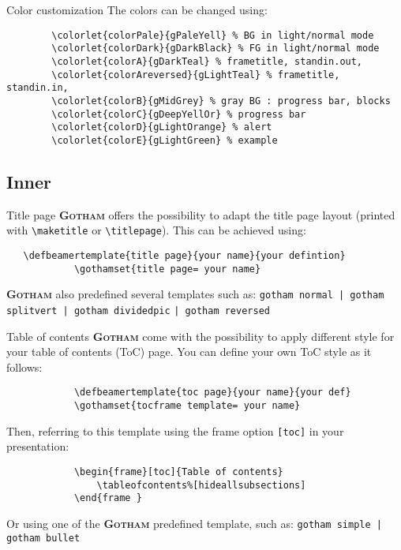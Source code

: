 \documentclass[aspectratio=169]{beamer}
\newcommand{\themename}{\textbf{\textsc{Gotham}}}
\begin{document}
	\begin{frame}[fragile]{Color customization}
		The colors can be changed using:
		\begin{verbatim}
		\colorlet{colorPale}{gPaleYell} % BG in light/normal mode
		\colorlet{colorDark}{gDarkBlack} % FG in light/normal mode
		\colorlet{colorA}{gDarkTeal} % frametitle, standin.out,
		\colorlet{colorAreversed}{gLightTeal} % frametitle, standin.in,
		\colorlet{colorB}{gMidGrey} % gray BG : progress bar, blocks
		\colorlet{colorC}{gDeepYellOr} % progress bar
		\colorlet{colorD}{gLightOrange} % alert
		\colorlet{colorE}{gLightGreen} % example 
		\end{verbatim}
	\end{frame}


\subsection{Inner}

	\begin{frame}[fragile]{Title page}
		\themename{} offers the possibility to adapt the title page layout (printed with \verb|\maketitle| or \verb|\titlepage|).
		This can be achieved using:

		\begin{verbatim}   \defbeamertemplate{title page}{your name}{your defintion}
			\gothamset{title page= your name}\end{verbatim}
		
		\themename{} also predefined several templates such as: 
		\verb$gotham normal | gotham splitvert | gotham dividedpic$ \verb$| gotham reversed$
	\end{frame}

	\begin{frame}[fragile]{Table of contents}
		\themename{} come with the possibility to apply different style for your table of contents (ToC) page.
		You can define your own ToC style as it follows:
		\begin{verbatim}
			\defbeamertemplate{toc page}{your name}{your def}
			\gothamset{tocframe template= your name}
		\end{verbatim}
		Then, referring to this template using the frame option \verb|[toc]| in your presentation: 
		\begin{verbatim}
			\begin{frame}[toc]{Table of contents}
				\tableofcontents%[hideallsubsections]
			\end{frame }\end{verbatim}

		Or using one of the \themename{} predefined template, such as: \verb$gotham simple | gotham bullet$
	\end{frame}
\end{document}
